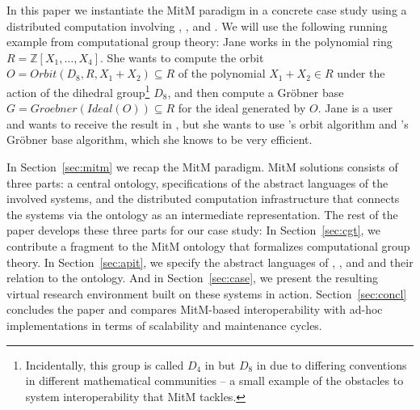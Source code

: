 In this paper we instantiate the MitM paradigm in a concrete case study using a distributed computation involving \GAP, \Sage, and \Singular.
We will use the following running example from computational group theory: Jane works in the polynomial ring $R=\mathbb{Z}[X_1,\ldots,X_4]$.
She wants to compute the orbit $O=Orbit(D_8,R,X_1+X_2)\subseteq R$ of the polynomial $X_1+X_2\in R$ under the action of the dihedral group\footnote{Incidentally, this group is called $D_4$ in \Sage but $D_8$ in \GAP due to differing conventions in different mathematical communities -- a small example of the obstacles to system interoperability that MitM tackles.} $D_8$, and then compute a Gr\"obner base $G=Groebner(Ideal(O))\subseteq R$ for the ideal generated by $O$.
Jane is a \Sage user and wants to receive the result in \Sage, but she wants to use \GAP's orbit algorithm and \Singular's Gr\"obner base algorithm, which she knows to be very efficient.

In Section~\ref{sec:mitm} we recap the MitM paradigm.
MitM solutions consists of three parts: a central ontology, specifications of the abstract languages of the involved systems, and the distributed computation infrastructure that connects the systems via the ontology as an intermediate representation.
The rest of the paper develops these three parts for our case study:
In Section~\ref{sec:cgt}, we contribute a fragment to the MitM ontology that formalizes computational group theory.
In Section~\ref{sec:apit}, we specify the abstract languages of \GAP, \Sage, and \Singular and their relation to the ontology.
And in Section~\ref{sec:case}, we present the resulting virtual research environment built on these systems in action.
Section~\ref{sec:concl} concludes the paper and compares MitM-based interoperability with ad-hoc implementations in terms of scalability and maintenance cycles. 


